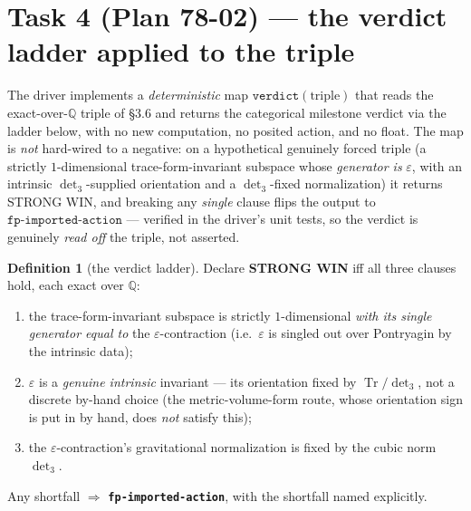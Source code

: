 \documentclass[11pt]{article}
\newcommand{\Q}{\mathbb{Q}}
\newcommand{\Tr}{\operatorname{Tr}}
\theoremstyle{definition}\newtheorem{remark}{Remark}
\theoremstyle{definition}\newtheorem{definition}{Definition}
\theoremstyle{plain}\newtheorem{proposition}{Proposition}
\theoremstyle{plain}\newtheorem{lemma}{Lemma}
\begin{document}
\section{Task 4 (Plan 78-02) --- the verdict ladder applied to the triple}
The driver implements a \emph{deterministic} map $\texttt{verdict}(\text{triple})$ that
reads the exact-over-$\Q$ triple of \S3.6 and returns the categorical milestone
verdict via the ladder below, with no new computation, no posited action, and no
float. The map is \emph{not} hard-wired to a negative: on a hypothetical genuinely
forced triple (a strictly $1$-dimensional trace-form-invariant subspace whose
\emph{generator is} $\varepsilon$, with an intrinsic $\det\nolimits_3$-supplied
orientation and a $\det\nolimits_3$-fixed normalization) it returns STRONG WIN, and
breaking any \emph{single} clause flips the output to $\texttt{fp-imported-action}$ ---
verified in the driver's unit tests, so the verdict is genuinely \emph{read off} the
triple, not asserted.

\begin{definition}[the verdict ladder]\label{def:ladder}
Declare \textbf{STRONG WIN} iff all three clauses hold, each exact over $\Q$:
\begin{enumerate}
\item[(C1)] the trace-form-invariant subspace is strictly $1$-dimensional \emph{with
its single generator equal to} the $\varepsilon$-contraction (i.e.\ $\varepsilon$ is
singled out over Pontryagin by the intrinsic data);
\item[(C2)] $\varepsilon$ is a \emph{genuine intrinsic} invariant --- its orientation
fixed by $\Tr/\det\nolimits_3$, not a discrete by-hand choice (the metric-volume-form
route, whose orientation sign is put in by hand, does \emph{not} satisfy this);
\item[(C3)] the $\varepsilon$-contraction's gravitational normalization is fixed by the
cubic norm $\det\nolimits_3$.
\end{enumerate}
Any shortfall $\Rightarrow$ \textbf{\texttt{fp-imported-action}}, with the shortfall
named explicitly.
\end{definition}
\end{document}

